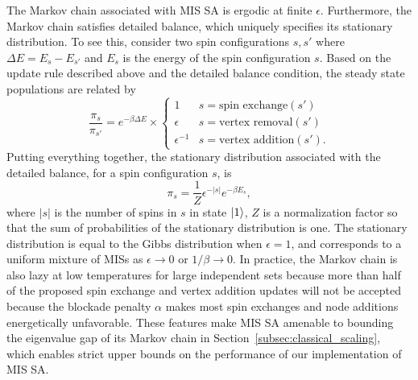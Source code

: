 \documentclass[twocolumn,amssymb,secnumarabic, prl, aps, nofootinbib]{revtex4-1}
\begin{document}
The Markov chain associated with MIS SA is ergodic at finite $\epsilon$.
Furthermore, the Markov chain satisfies detailed balance, %
which uniquely specifies its stationary distribution.
To see this,
consider two spin configurations $s, s'$ where $\Delta E = E_s-E_{s'}$ and $E_s$ is the energy of the spin configuration $s$. Based on the update rule described above and the detailed balance condition, the steady state populations are related by 
\begin{equation}
	\frac{\pi_s}{\pi_{s'}} = e^{-\beta \Delta E}\times \begin{cases}
		1 & s = \text{spin exchange}(s')\\
		\epsilon & s = \text{vertex removal}(s')\\
		\epsilon^{-1} & s = \text{vertex addition}(s').
	\end{cases}
\end{equation}
Putting everything together, the stationary distribution associated with the detailed balance, for a spin configuration $s$, is 
\begin{equation}
	\pi_s = \frac{1}{Z}\epsilon^{-|s|}e^{-\beta  E_s},\label{eq:sstate}
\end{equation}
where $|s|$ is the number of spins in $s$ in state $\ket{1}$, $Z$ is a normalization factor so that the sum of probabilities of the stationary distribution is one.
The stationary distribution is equal to the Gibbs distribution when $\epsilon=1$, and corresponds to a uniform mixture of MISs as $\epsilon \rightarrow 0$ or $1/\beta\rightarrow 0.$ In practice, the Markov chain is also lazy at low temperatures for large independent sets because more than half of the proposed spin exchange and vertex addition updates will not be accepted because the blockade penalty $\alpha$ makes most spin exchanges and node additions energetically unfavorable.  These features make MIS SA amenable to bounding the eigenvalue gap of its Markov chain in Section~\ref{subsec:classical_scaling}, which enables strict upper bounds on the performance of our implementation of MIS SA.\\
\end{document}
